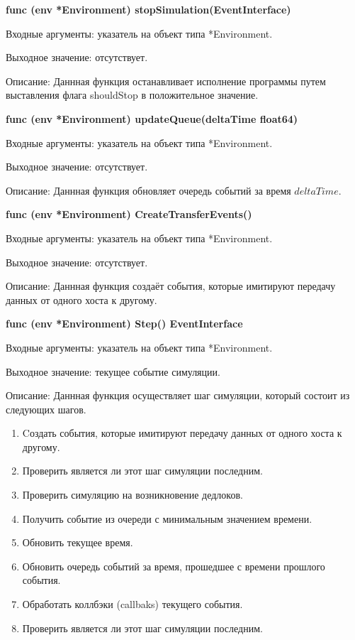 \textbf{func (env *Environment) stopSimulation(EventInterface)}

Входные аргументы: указатель на объект типа *Environment.

Выходное значение: отсутствует.

Описание: Даннная функция останавливает исполнение программы путем выставления флага shouldStop в положительное значение.

\textbf{func (env *Environment) updateQueue(deltaTime float64) }

Входные аргументы: указатель на объект типа *Environment.

Выходное значение: отсутствует.

Описание: Даннная функция обновляет очередь событий за время $deltaTime$. 

\textbf{func (env *Environment) CreateTransferEvents()}

Входные аргументы: указатель на объект типа *Environment.

Выходное значение: отсутствует.

Описание: Даннная функция создаёт события, которые имитируют передачу данных от одного хоста к другому.

\textbf{func (env *Environment) Step() EventInterface }

Входные аргументы: указатель на объект типа *Environment.

Выходное значение: текущее событие симуляции.

Описание: Даннная функция осуществляет шаг симуляции, который состоит из следующих шагов. 
\begin{enumerate}
\item Cоздать события, которые имитируют передачу данных от одного хоста к другому.
\item Проверить является ли этот шаг симуляции последним.
\item Проверить симуляцию на возникновение дедлоков.
\item Получить событие из очереди с минимальным значением времени.
\item Обновить текущее время.
\item Обновить очередь событий за время, прошедшее с времени прошлого события.
\item Обработать коллбэки (callbaks) текущего события.
\item Проверить является ли этот шаг симуляции последним.

\end{enumerate}

